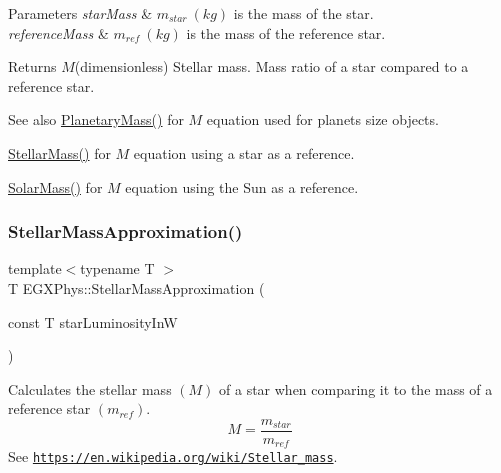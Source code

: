 \begin{DoxyParams}{Parameters}
{\em star\+Mass} & $m_{star}\ (kg)$ is the mass of the star. \\
\hline
{\em reference\+Mass} & $m_{ref}\ (kg)$ is the mass of the reference star. \\
\hline
\end{DoxyParams}
\begin{DoxyReturn}{Returns}
$M$(dimensionless) Stellar mass. Mass ratio of a star compared to a reference star. 
\end{DoxyReturn}
\begin{DoxySeeAlso}{See also}
\mbox{\hyperlink{group___e_g_x_phys-_planetary_mass_ga225bcf56fb37468f6d4d46493d403503}{Planetary\+Mass()}} for $M$ equation used for planets size objects. 

\mbox{\hyperlink{group___e_g_x_phys-_stellar_mass_ga6c1b42cfd62e3174709ddbf15a87b460}{Stellar\+Mass()}} for $M$ equation using a star as a reference. 

\mbox{\hyperlink{group___e_g_x_phys-_stellar_mass_ga4988f903a27ec9cfa63f72b003d876fd}{Solar\+Mass()}} for $M$ equation using the Sun as a reference. 
\end{DoxySeeAlso}
\mbox{\label{group___e_g_x_phys-_stellar_mass_ga5eeb9652876859bff3afdd352dd7925e}} 
\subsubsection{\texorpdfstring{Stellar\+Mass\+Approximation()}{StellarMassApproximation()}}
{\footnotesize\ttfamily template$<$typename T $>$ \\
T E\+G\+X\+Phys\+::\+Stellar\+Mass\+Approximation (\begin{DoxyParamCaption}\item[{const T}]{star\+Luminosity\+InW }\end{DoxyParamCaption})}



Calculates the stellar mass $(M)$ of a star when comparing it to the mass of a reference star $(m_{ref})$. \[M=\frac{m_{star}}{m_{ref}}\] See \href{https://en.wikipedia.org/wiki/Stellar_mass}{\tt https\+://en.\+wikipedia.\+org/wiki/\+Stellar\+\_\+mass}. 


